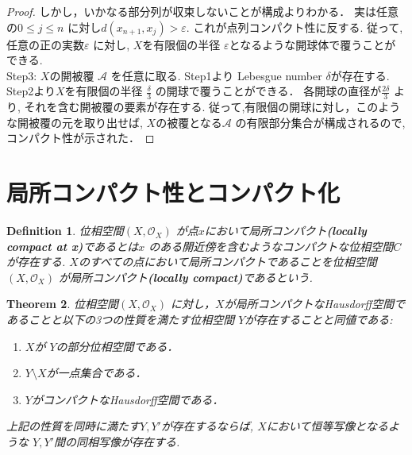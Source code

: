 \documentclass[lualatex]{ltjsbook}
\newtheorem{theorem}{Theorem}[section]
\newtheorem{definition}[theorem]{Definition}
\theoremstyle{remark}
\theoremstyle{plain}
\begin{document}
\begin{proof}
	 しかし，いかなる部分列が収束しないことが構成よりわかる．
	 実は任意の$0 \le j \le n$ に対し$d(x_{n+1},x_j)>\varepsilon$. 
	 これが点列コンパクト性に反する. 
	 従って, 任意の正の実数$\varepsilon$ に対し, $X$を有限個の半径 $\varepsilon$となるような開球体で覆うことができる.\\
	 Step3:  $X$の開被覆 $\mathcal{A}$ を任意に取る. 
	 Step1より Lebesgue number $\delta$が存在する. 
	 Step2より$X$を有限個の半径 $\frac{\delta}{3}$ の開球で覆うことができる．
	 各開球の直径が$\frac{2\delta}{3}$ より, 
	 それを含む開被覆の要素が存在する. 
	 従って,有限個の開球に対し，このような開被覆の元を取り出せば,
	 $X$の被覆となる$\mathcal{A}$ の有限部分集合が構成されるので, 
	 コンパクト性が示された．
\end{proof}

\section{局所コンパクト性とコンパクト化}

\begin{definition}
	位相空間$\left( X , \mathcal{O}_{X} \right)$ が点$x$において局所コンパクト\textbf{(locally compact at x)}であるとは$x$ のある開近傍を含むようなコンパクトな位相空間$C$が存在する.  $X$のすべての点において局所コンパクトであることを位相空間 $\left( X , \mathcal{O}_{X} \right)$ が局所コンパクト\textbf{(locally compact)}であるという.
\end{definition}

\begin{theorem}
	位相空間$\left( X , \mathcal{O}_{X} \right)$ に対し，$X$が局所コンパクトなHausdorff空間であることと以下の3つの性質を満たす位相空間 $Y$が存在することと同値である:
	 \begin{enumerate}
		\item $X$が $Y$の部分位相空間である．
		\item $Y \setminus X$が一点集合である．
		\item $Y$がコンパクトなHausdorff空間である．
	\end{enumerate}
	上記の性質を同時に満たす$Y,Y'$が存在するならば,  $X$において恒等写像となるような $Y,Y'$間の同相写像が存在する.
\end{theorem}
\end{document}
